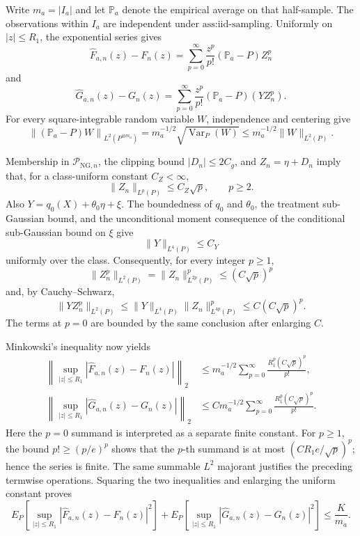 Write \(m_a=|I_a|\) and let \(\mathbb P_a\) denote the empirical average on that half-sample.  The observations within \(I_a\) are independent under \(\text{ass:iid-sampling}\).  Uniformly on \(|z|\le R_1\), the exponential series gives
\[
 \widehat F_{a,n}(z)-F_n(z)
 =\sum_{p=0}^{\infty}\frac{z^p}{p!}(\mathbb P_a-P)Z_n^p
\]
and
\[
 \widehat G_{a,n}(z)-G_n(z)
 =\sum_{p=0}^{\infty}\frac{z^p}{p!}(\mathbb P_a-P)(YZ_n^p).
\]
For every square-integrable random variable \(W\), independence and centering give
\[
 \left\|(\mathbb P_a-P)W\right\|_{L^2(P^{\otimes m_a})}
 =m_a^{-1/2}\sqrt{\operatorname{Var}_P(W)}
 \le m_a^{-1/2}\lVert W\rVert_{L^2(P)}.
\]

Membership in \(\mathcal P_{\mathrm{NG},n}\), the clipping bound \(|D_n|\le2C_g\), and \(Z_n=\eta+D_n\) imply that, for a class-uniform constant \(C_Z<\infty\),
\[
 \lVert Z_n\rVert_{L^p(P)}\le C_Z\sqrt p,
 \qquad p\ge2.
\]
Also \(Y=q_0(X)+\theta_0\eta+\xi\).  The boundedness of \(q_0\) and \(\theta_0\), the treatment sub-Gaussian bound, and the unconditional moment consequence of the conditional sub-Gaussian bound on \(\xi\) give
\[
 \lVert Y\rVert_{L^4(P)}\le C_Y
\]
uniformly over the class.  Consequently, for every integer \(p\ge1\),
\[
 \lVert Z_n^p\rVert_{L^2(P)}
 =\lVert Z_n\rVert_{L^{2p}(P)}^p
 \le(C\sqrt p)^p
\]
and, by Cauchy--Schwarz,
\[
 \lVert YZ_n^p\rVert_{L^2(P)}
 \le\lVert Y\rVert_{L^4(P)}
     \lVert Z_n\rVert_{L^{4p}(P)}^p
 \le C(C\sqrt p)^p.
\]
The terms at \(p=0\) are bounded by the same conclusion after enlarging \(C\).

Minkowski's inequality now yields
\[
 \begin{aligned}
 \left\|\sup_{|z|\le R_1}|\widehat F_{a,n}(z)-F_n(z)|\right\|_2
 &\le m_a^{-1/2}\sum_{p=0}^{\infty}
   \frac{R_1^p(C\sqrt p)^p}{p!},\\
 \left\|\sup_{|z|\le R_1}|\widehat G_{a,n}(z)-G_n(z)|\right\|_2
 &\le Cm_a^{-1/2}\sum_{p=0}^{\infty}
   \frac{R_1^p(C\sqrt p)^p}{p!}.
 \end{aligned}
\]
Here the \(p=0\) summand is interpreted as a separate finite constant.  For \(p\ge1\), the bound \(p!\ge(p/e)^p\) shows that the \(p\)-th summand is at most \((CR_1e/\sqrt p)^p\); hence the series is finite.  The same summable \(L^2\) majorant justifies the preceding termwise operations.  Squaring the two inequalities and enlarging the uniform constant proves
\[
 E_P\!\left[\sup_{|z|\le R_1}|\widehat F_{a,n}(z)-F_n(z)|^2\right]
 +E_P\!\left[\sup_{|z|\le R_1}|\widehat G_{a,n}(z)-G_n(z)|^2\right]
 \le\frac K{m_a}.
\]